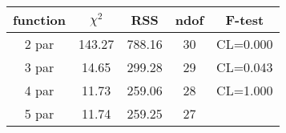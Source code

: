 \begin{tabular}{c|c|c|c|c}
function & $\chi^2$ & RSS & ndof & F-test \\
\hline
2 par & 143.27 & 788.16 & 30 & CL=0.000 \\
3 par & 14.65 & 299.28 & 29 & CL=0.043 \\
4 par & 11.73 & 259.06 & 28 & CL=1.000 \\
5 par & 11.74 & 259.25 & 27 & \\
\hline
\end{tabular}